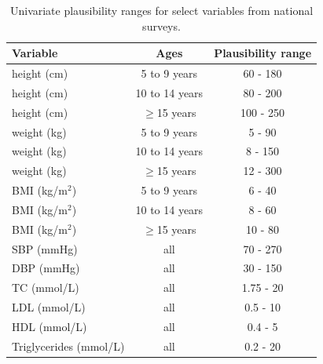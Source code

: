 \documentclass[12pt]{article}
\begin{document}
\begin{appendix}
\begin{refsection}
    \begin{table}[H]
        \centering
        \caption{Univariate plausibility ranges for select variables from national surveys.}
        \begin{tabular}{lcc}
            \hline
            Variable & Ages & Plausibility range \\
            \hline
            height (cm) & 5 to 9 years & 60 - 180 \\
            height (cm) & 10 to 14 years & 80 - 200 \\
            height (cm) & $\geq$15 years & 100 - 250 \\
            weight (kg) & 5 to 9 years & 5 - 90 \\
            weight (kg) & 10 to 14 years & 8 - 150 \\
            weight (kg) & $\geq$15 years & 12 - 300 \\
            BMI (kg/m$^2$) & 5 to 9 years & 6 - 40 \\
            BMI (kg/m$^2$) & 10 to 14 years & 8 - 60 \\
            BMI (kg/m$^2$) & $\geq$15 years & 10 - 80 \\
            SBP (mmHg) & all & 70 - 270 \\
            DBP (mmHg) & all & 30 - 150 \\
            TC (mmol/L) & all & 1.75 - 20 \\
            LDL (mmol/L) & all & 0.5 - 10 \\
            HDL (mmol/L) & all & 0.4 - 5 \\
            Triglycerides (mmol/L) & all & 0.2 - 20 \\
            \hline
        \end{tabular}
        \label{tab:plausibility}
    \end{table}


\end{refsection}
\end{appendix}
\end{document}
